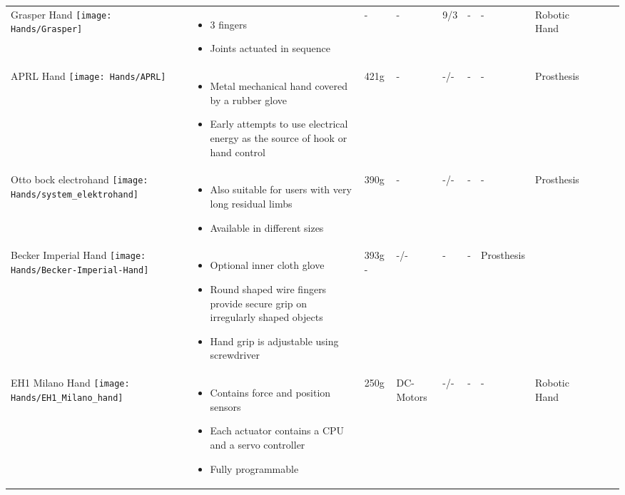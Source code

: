 \documentclass[main]{subfiles}
\begin{document}
\begin{longtable}{@{}p{6cm}p{4cm}p{0.7cm}p{1.2cm}p{1cm}p{1cm}p{1cm}p{1cm}p{1cm}p{1cm}p{2cm}@{}}
Grasper Hand \newline
\texttt{[image: Hands/Grasper]}& 
\begin{itemize}\itemsep0em
\item 3 fingers
\item Joints actuated in sequence
\end{itemize} 
& - & - & 9/3 & - & -  & Robotic Hand\\

APRL Hand \newline
\texttt{[image: Hands/APRL]}& 
\begin{itemize}\itemsep0em
\item Metal mechanical hand covered by a rubber glove
\item Early attempts to use electrical energy as the source of hook or hand control
\end{itemize} 
& 421g & - & -/- & - & - & Prosthesis\\

Otto bock electrohand \newline
\texttt{[image: Hands/system\_elektrohand]}& 
\begin{itemize}\itemsep0em
\item Also suitable for users with very long residual limbs
\item Available in different sizes
\end{itemize} 
& 390g & - & -/- & - & - & Prosthesis\\

Becker Imperial Hand \newline
\texttt{[image: Hands/Becker-Imperial-Hand]}& 
\begin{itemize}\itemsep0em
\item Optional inner cloth glove
\item Round shaped wire fingers provide secure grip on irregularly shaped objects
\item Hand grip is adjustable using screwdriver
\end{itemize} 
& 393g - & -/- & - & -  & Prosthesis\\

EH1 Milano Hand \newline
\texttt{[image: Hands/EH1\_Milano\_hand]}& 
\begin{itemize}\itemsep0em
\item Contains force and position sensors
\item Each actuator contains a CPU and a servo controller
\item Fully programmable 
\end{itemize} 
& 250g & DC-Motors & -/- & - & - & Robotic Hand\\


\end{longtable}
\end{document}
